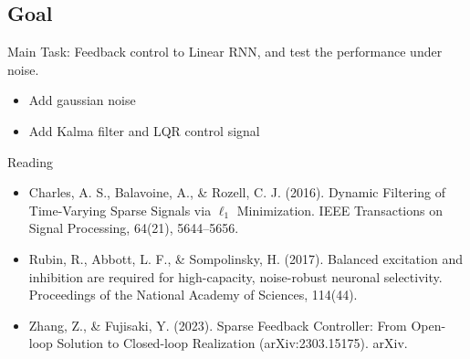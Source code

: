 \documentclass[12pt, a4paper]{article}
\begin{document}
\subsection*{Goal}

\noindent
Main Task: Feedback control to Linear RNN, and test the performance under noise.

\begin{itemize}
    \item Add gaussian noise
    \item Add Kalma filter and LQR control signal
\end{itemize}

\noindent
Reading

\begin{itemize}
    \item Charles, A. S., Balavoine, A., \& Rozell, C. J. (2016). Dynamic Filtering of Time-Varying Sparse Signals via $\ell _1$ Minimization. IEEE Transactions on Signal Processing, 64(21), 5644–5656.
    \item Rubin, R., Abbott, L. F., \& Sompolinsky, H. (2017). Balanced excitation and inhibition are required for high-capacity, noise-robust neuronal selectivity. Proceedings of the National Academy of Sciences, 114(44).
    \item Zhang, Z., \& Fujisaki, Y. (2023). Sparse Feedback Controller: From Open-loop Solution to Closed-loop Realization (arXiv:2303.15175). arXiv.
\end{itemize}

\newpage
\end{document}
